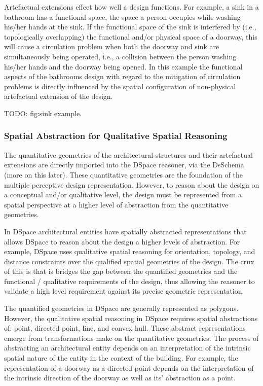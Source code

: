 \documentclass[12pt]{ucthesis}
\begin{document}
Artefactual extensions effect how well a design functions. For example, a sink in a bathroom has a functional space, the space a person occupies while washing his/her hands at the sink. If the functional space of the sink is interfered by (i.e., topologically overlapping) the functional and/or physical space of a doorway, this will cause a circulation problem when both the doorway and sink are simultaneously being operated, i.e., a collision between the person washing his/her hands and the doorway being opened. In this example the functional aspects of the bathrooms design with regard to the mitigation of circulation problems is directly influenced by the spatial configuration of non-physical artefactual extension of the design. 

TODO: fig:sink example.

\subsubsection{Spatial Abstraction for Qualitative Spatial Reasoning}
The quantitative geometries of the architectural structures and their artefactual extensions are directly imported into the DSpace reasoner, via the DsSchema (more on this later). These quantitative geometries are the foundation of the multiple perceptive design representation. However, to reason about the design on a conceptual and/or qualitative level, the design must be represented from a spatial perspective at a higher level of abstraction from the quantitative geometries. 

In DSpace architectural entities have spatially abstracted representations that allows DSpace to reason about the design a higher levels of abstraction. For example, DSpace uses qualitative spatial reasoning for orientation, topology, and distance constraints over the qualified spatial geometries of the design. The crux of this is that is bridges the gap between the quantified geometries and the functional / qualitative requirements of the design, thus allowing the reasoner to validate a high level requirement against its precise geometric representation. 

The quantified geometries in DSpace are generally represented as polygons. However, the qualitative spatial reasoning in DSpace requires spatial abstractions of: point, directed point, line, and convex hull. These abstract representations emerge from transformations make on the quantitative geometries. The process of abstracting an architectural entity depends on an interpretation of the intrinsic spatial nature of the entity in the context of the building. For example, the representation of a doorway as a directed point depends on the interpretation of the intrinsic direction of the doorway as well as its' abstraction as a point. 
\end{document}

